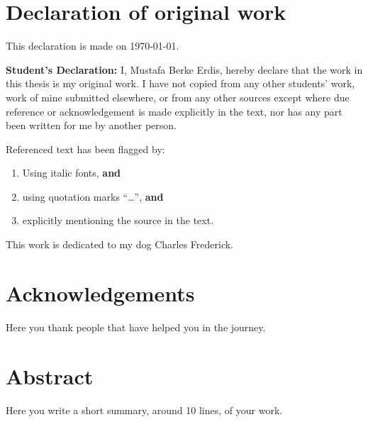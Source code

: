 \documentclass[12pt, oneside]{book}
\theoremstyle{plain}
\theoremstyle{definition}
\begin{document}
\chapter*{Declaration of original work}
\begin{flushright}
This declaration is made on \today.
\end{flushright}


{\bf Student's Declaration:}
I, Mustafa Berke Erdis, hereby declare that the work in this thesis 
is my original work. I have not copied from any other students' work, work of 
mine submitted elsewhere,  or from any other sources except where due reference or acknowledgement is made explicitly in the text, nor has any part been written for me by another person.

Referenced text has been flagged by:
\begin{enumerate}
\item Using italic fonts, {\bf and} %
\item using quotation marks ``\ldots '', {\bf and}
\item explicitly mentioning the source in the text.
\end{enumerate}


\newpage

\thispagestyle{empty}
        \begin{flushright}
                This work is dedicated to my dog Charles Frederick.
        \end{flushright}
\null



\chapter*{Acknowledgements}
Here you thank people that have helped you in the journey. \\
\lipsum[100] %

\chapter*{Abstract}
\begin{center}
\small 
Here you write a short summary, around 10 lines, of your work. \\
\lipsum[100]%
\end{center}       
\end{document}
